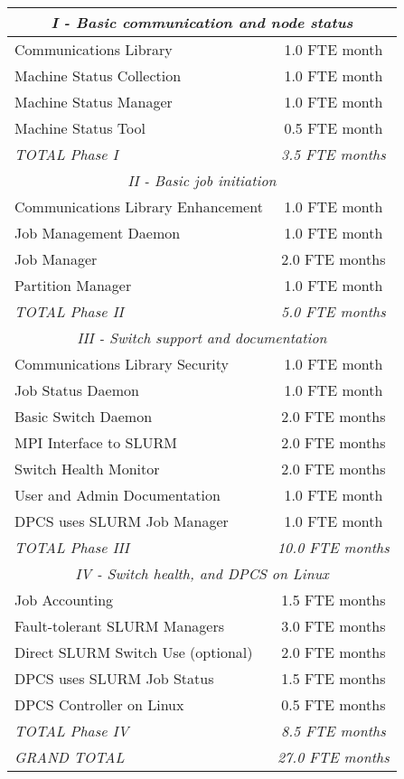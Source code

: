 \begin{center}
\begin{tabular}{|l|c|}\hline
\multicolumn{2}{|c|}{\em I - Basic communication and node status} \\ \hline
Communications Library             & 1.0 FTE month \\
Machine Status Collection          & 1.0 FTE month \\
Machine Status Manager             & 1.0 FTE month \\
Machine Status Tool                & 0.5 FTE month \\
{\em TOTAL Phase I}		   & {\em 3.5 FTE months} \\ \hline
\multicolumn{2}{|c|}{\em II - Basic job initiation} \\ \hline
Communications Library Enhancement & 1.0 FTE month \\
Job Management Daemon              & 1.0 FTE month \\
Job Manager                        & 2.0 FTE months \\
Partition Manager                  & 1.0 FTE month \\
{\em TOTAL Phase II}		   & {\em 5.0 FTE months} \\ \hline
\multicolumn{2}{|c|}{\em III - Switch support and documentation} \\ \hline
Communications Library Security    & 1.0 FTE month \\
Job Status Daemon                  & 1.0 FTE month \\
Basic Switch Daemon                & 2.0 FTE months \\
MPI Interface to SLURM             & 2.0 FTE months \\
Switch Health Monitor              & 2.0 FTE months \\
User and Admin Documentation       & 1.0 FTE month \\
DPCS uses SLURM Job Manager        & 1.0 FTE month \\
{\em TOTAL Phase III}		   & {\em 10.0 FTE months} \\ \hline
\multicolumn{2}{|c|}{\em IV - Switch health, and DPCS on Linux} \\ \hline
Job Accounting                     & 1.5 FTE months \\
Fault-tolerant SLURM Managers      & 3.0 FTE months \\
Direct SLURM Switch Use (optional) & 2.0 FTE months \\
DPCS uses SLURM Job Status         & 1.5 FTE months \\
DPCS Controller on Linux           & 0.5 FTE months \\
{\em TOTAL Phase IV}		   & {\em 8.5 FTE months} \\ \hline
{\em GRAND TOTAL}		   & {\em 27.0 FTE months} \\ \hline
\end{tabular}
\end{center}

